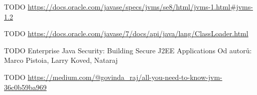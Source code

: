\begin{literatura}{99}
    TODO \url{https://docs.oracle.com/javase/specs/jvms/se8/html/jvms-1.html#jvms-1.2}

    TODO \url{https://docs.oracle.com/javase/7/docs/api/java/lang/ClassLoader.html}

    TODO Enterprise Java Security: Building Secure J2EE Applications
    Od autorů: Marco Pistoia, Larry Koved, Nataraj 

    TODO \url{https://medium.com/@govinda_raj/all-you-need-to-know-jvm-36c0b59ba969}

\end{literatura}